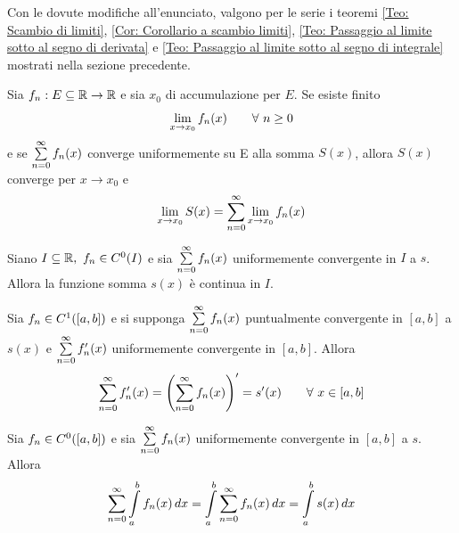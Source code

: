 Con le dovute modifiche all'enunciato, valgono per le serie i teoremi \ref{Teo: Scambio di limiti}, \ref{Cor: Corollario a scambio limiti}, \ref{Teo: Passaggio al limite sotto al segno di derivata} e \ref{Teo: Passaggio al limite sotto al segno di integrale} mostrati nella sezione precedente.
\begin{theorem}
    Sia $f_n: E \subseteq \mathbb{R} \to \mathbb{R}$ e sia $x_0$ di accumulazione per $E$. Se esiste finito
    \begin{equation*}
        \lim_{x \to x_0}{f_n(x)} \qquad \forall\ n\geq0
    \end{equation*}
    e se $\sum\limits_{n=0}^{\infty}{f_n(x)}$ converge uniformemente su E alla somma $S(x)$, allora $S(x)$ converge per $x \to x_0$ e 
    \begin{equation*}
        \lim_{x \to x_0}{S(x)= \sum\limits_{n=0}^{\infty}{\lim_{x \to x_0}{f_n(x)}}}
    \end{equation*}
\end{theorem}
\begin{theorem}
    Siano $I \subseteq \mathbb{R},\ f_n \in C^0(I)$ e sia $\sum\limits_{n=0}^{\infty}{f_n(x)}$ uniformemente convergente in $I$ a $s$. Allora la funzione somma $s(x)$ è continua in $I$.
\end{theorem}
\begin{theorem}
    Sia $f_n \in C^1([a,b])$ e si supponga $\sum\limits_{n=0}^{\infty}{f_n(x)}$ puntualmente convergente in $[a,b]$ a $s(x)$ e $\sum\limits_{n=0}^{\infty}{f_n'(x)}$ uniformemente convergente in $[a,b]$. Allora
    \begin{equation*}
        \sum\limits_{n=0}^{\infty}{f_n'(x)}= 
        \left(\sum\limits_{n=0}^{\infty}{f_n(x)}\right)'= s'(x) \qquad \forall\ x \in [a,b]
    \end{equation*}
\end{theorem}
\begin{theorem}
    Sia $f_n \in C^0([a,b])$ e sia $\sum\limits_{n=0}^{\infty}{f_n(x)}$ uniformemente convergente in $[a,b]$ a $s$. Allora
    \begin{equation*}
        \sum\limits_{n=0}^{\infty}{\int\limits_{a}^{b}{f_n(x)}\, dx}= \int\limits_{a}^{b}{\sum\limits_{n=0}^{\infty}{f_n(x)}\, dx}= \int\limits_{a}^{b}{s(x)}\, dx
    \end{equation*}
\end{theorem}
